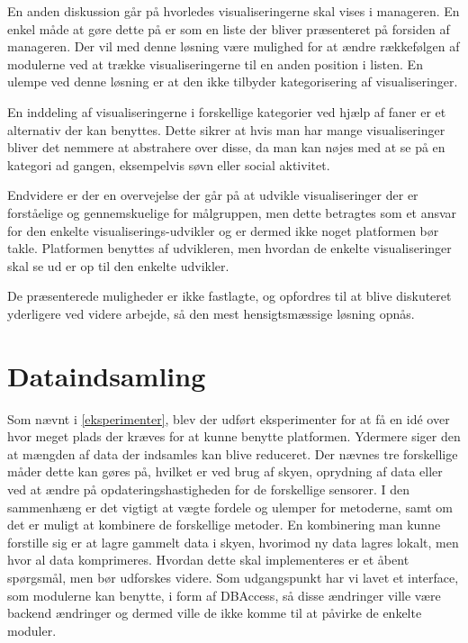 En anden diskussion går på hvorledes visualiseringerne skal vises i manageren.
En enkel måde at gøre dette på er som en liste der bliver præsenteret på forsiden af manageren.
Der vil med denne løsning være mulighed for at ændre rækkefølgen af modulerne ved at trække visualiseringerne til en anden position i listen.
En ulempe ved denne løsning er at den ikke tilbyder kategorisering af visualiseringer.

En inddeling af visualiseringerne i forskellige kategorier ved hjælp af faner er et alternativ der kan benyttes.
Dette sikrer at hvis man har mange visualiseringer bliver det nemmere at abstrahere over disse, da man kan nøjes med at se på en kategori ad gangen, eksempelvis søvn eller social aktivitet.

Endvidere er der en overvejelse der går på at udvikle visualiseringer der er forståelige og gennemskuelige for målgruppen, men dette betragtes som et ansvar for den enkelte visualiserings-udvikler og er dermed ikke noget platformen bør takle.
Platformen benyttes af udvikleren, men hvordan de enkelte visualiseringer skal se ud er op til den enkelte udvikler.

De præsenterede muligheder er ikke fastlagte, og opfordres til at blive diskuteret yderligere ved videre arbejde, så den mest hensigtsmæssige løsning opnås.

\section{Dataindsamling}
Som nævnt i \cref{eksperimenter}, blev der udført eksperimenter for at få en idé over hvor meget plads der kræves for at kunne benytte platformen.
Ydermere siger den at mængden af data der indsamles kan blive reduceret.
Der nævnes tre forskellige måder dette kan gøres på, hvilket er ved brug af skyen, oprydning af data eller ved at ændre på opdateringshastigheden for de forskellige sensorer.
I den sammenhæng er det vigtigt at vægte fordele og ulemper for metoderne, samt om det er muligt at kombinere de forskellige metoder.
En kombinering man kunne forstille sig er at lagre gammelt data i skyen, hvorimod ny data lagres lokalt, men hvor al data komprimeres.
Hvordan dette skal implementeres er et åbent spørgsmål, men bør udforskes videre.
Som udgangspunkt har vi lavet et interface, som modulerne kan benytte, i form af DBAccess, så disse ændringer ville være backend ændringer og dermed ville de ikke komme til at påvirke de enkelte moduler.


